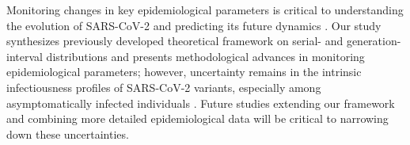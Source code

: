 \documentclass[12pt]{article}
\begin{document}
Monitoring changes in key epidemiological parameters is critical to understanding the evolution of SARS-CoV-2 and predicting its future dynamics \citep{kraemer2021monitoring}.
Our study synthesizes previously developed theoretical framework on serial- and generation-interval distributions and presents methodological advances in monitoring epidemiological parameters;
however, uncertainty remains in the intrinsic infectiousness profiles of SARS-CoV-2 variants, especially among asymptomatically infected individuals \citep{park2020time}.
Future studies extending our framework and combining more detailed epidemiological data will be critical to narrowing down these uncertainties.

\pagebreak


\end{document}
